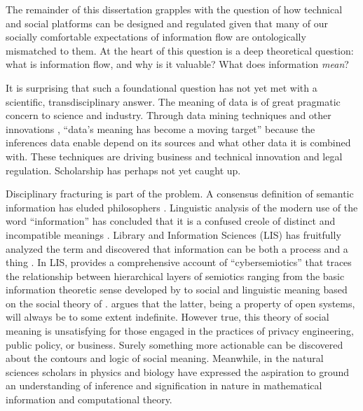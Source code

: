 \documentclass[../thesis.tex]{subfiles}
\begin{document}
 The remainder of this dissertation grapples with the question of how technical and social platforms can be designed and regulated given that many of our socially comfortable expectations of information flow are ontologically mismatched to them.
 At the heart of this question is a deep theoretical question:
 what is information flow, and why is it valuable?
 What does information \textit{mean}?

 It is surprising that such a foundational question has
 not yet met with a scientific, transdisciplinary answer.
 The meaning of data is of great pragmatic concern
 to science and industry.
 Through data mining techniques and other innovations
 \cite{malin2001re} \cite{narayanan2006break},
 ``data's meaning has become a moving target''
 \cite{horvitz2015data} because the inferences data enable
 depend on its sources and what other data it is combined with.
 These techniques are driving business and technical innovation
 and legal regulation.
 Scholarship has perhaps not yet caught up.

 Disciplinary fracturing is part of the problem.
 A consensus definition of semantic information has eluded
 philosophers \citep{sep-information-semantic}.
 Linguistic analysis of the modern use of the word ``information''
 has concluded that it is a confused creole of distinct and
 incompatible meanings \citep{nunberg1996farewell}.
 Library and Information Sciences (LIS) has fruitfully analyzed the
 term and discovered that information can be both a process
 and a thing \cite{buckland1991information}. In LIS,
 \citet{brier2008cybersemiotics} provides a comprehensive account
 of ``cybersemiotics'' that traces the relationship between
 hierarchical layers of semiotics ranging from
 the basic information theoretic
 sense developed by \citet{shannon1948mathematical} to
 social and linguistic meaning based on the social theory of
 \citet{luhmann1995social}.
 \citet{brier2008cybersemiotics} argues that the latter, being
 a property of open systems, will always be to some extent
 indefinite.
 However true, this theory of social meaning
 is unsatisfying for those engaged in
 the practices of privacy engineering, public policy, or
 business.
 Surely something more actionable can be discovered about the
 contours and logic of social meaning.
 Meanwhile, in the natural sciences scholars in physics
 \citep{wolpert2008physical} and biology \citep{deacon2015steps}
 have expressed the aspiration to ground an understanding of
 inference and signification in nature in mathematical information
 and computational theory.
 
\end{document}
